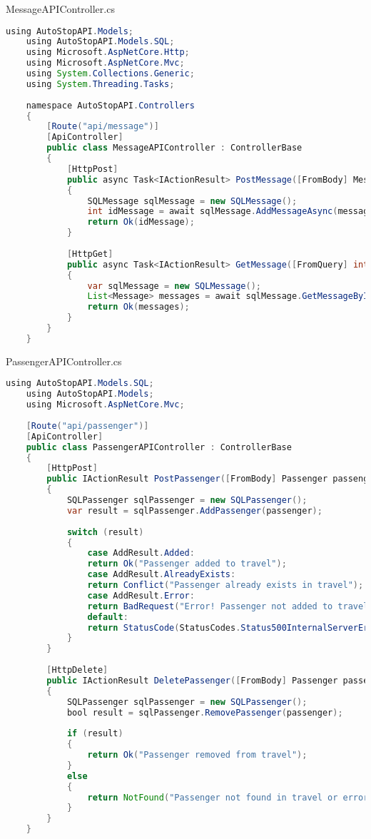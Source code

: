 MessageAPIController.cs
\begin{lstlisting}[language=Java]
	using AutoStopAPI.Models;
	using AutoStopAPI.Models.SQL;
	using Microsoft.AspNetCore.Http;
	using Microsoft.AspNetCore.Mvc;
	using System.Collections.Generic;
	using System.Threading.Tasks;
	
	namespace AutoStopAPI.Controllers
	{
		[Route("api/message")]
		[ApiController]
		public class MessageAPIController : ControllerBase
		{
			[HttpPost]
			public async Task<IActionResult> PostMessage([FromBody] Message message)
			{
				SQLMessage sqlMessage = new SQLMessage();
				int idMessage = await sqlMessage.AddMessageAsync(message);
				return Ok(idMessage);
			}
			
			[HttpGet]
			public async Task<IActionResult> GetMessage([FromQuery] int idChat)
			{
				var sqlMessage = new SQLMessage();
				List<Message> messages = await sqlMessage.GetMessageByIdAsync(idChat);
				return Ok(messages);
			}
		}
	}
\end{lstlisting}

PassengerAPIController.cs
\begin{lstlisting}[language=Java]
	using AutoStopAPI.Models.SQL;
	using AutoStopAPI.Models;
	using Microsoft.AspNetCore.Mvc;
	
	[Route("api/passenger")]
	[ApiController]
	public class PassengerAPIController : ControllerBase
	{
		[HttpPost]
		public IActionResult PostPassenger([FromBody] Passenger passenger)
		{
			SQLPassenger sqlPassenger = new SQLPassenger();
			var result = sqlPassenger.AddPassenger(passenger);
			
			switch (result)
			{
				case AddResult.Added:
				return Ok("Passenger added to travel");
				case AddResult.AlreadyExists:
				return Conflict("Passenger already exists in travel");
				case AddResult.Error:
				return BadRequest("Error! Passenger not added to travel");
				default:
				return StatusCode(StatusCodes.Status500InternalServerError, "Unknown error");
			}
		}
		
		[HttpDelete]
		public IActionResult DeletePassenger([FromBody] Passenger passenger)
		{
			SQLPassenger sqlPassenger = new SQLPassenger();
			bool result = sqlPassenger.RemovePassenger(passenger);
			
			if (result)
			{
				return Ok("Passenger removed from travel");
			}
			else
			{
				return NotFound("Passenger not found in travel or error occurred");
			}
		}
	}
\end{lstlisting}

